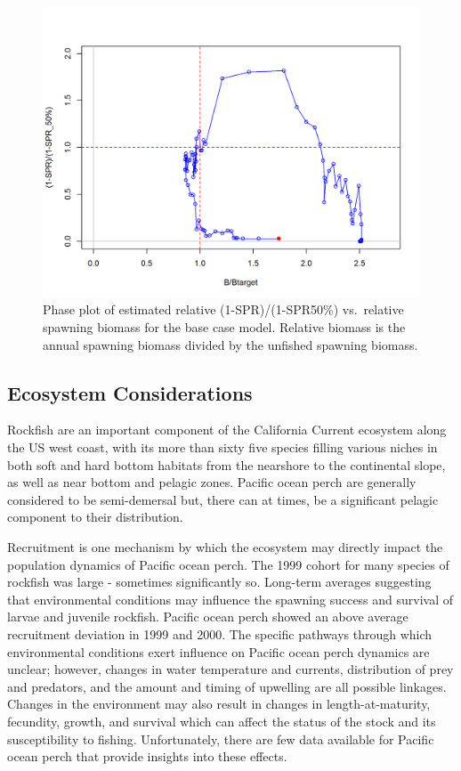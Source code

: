 \documentclass[12pt,]{article}
\begin{document}
\begin{figure}
\centering
\includegraphics{r4ss/plots_mod1/SPR4_phase.png}
\caption{Phase plot of estimated relative (1-SPR)/(1-SPR50\%)
vs.~relative spawning biomass for the base case model. Relative biomass
is the annual spawning biomass divided by the unfished spawning biomass.
\label{fig:Phase_all}}
\end{figure}

\FloatBarrier

\subsection*{Ecosystem Considerations}\label{ecosystem-considerations}

Rockfish are an important component of the California Current ecosystem
along the US west coast, with its more than sixty five species filling
various niches in both soft and hard bottom habitats from the nearshore
to the continental slope, as well as near bottom and pelagic zones.
Pacific ocean perch are generally considered to be semi-demersal but,
there can at times, be a significant pelagic component to their
distribution.

Recruitment is one mechanism by which the ecosystem may directly impact
the population dynamics of Pacific ocean perch. The 1999 cohort for many
species of rockfish was large - sometimes significantly so. Long-term
averages suggesting that environmental conditions may influence the
spawning success and survival of larvae and juvenile rockfish. Pacific
ocean perch showed an above average recruitment deviation in 1999 and
2000. The specific pathways through which environmental conditions exert
influence on Pacific ocean perch dynamics are unclear; however, changes
in water temperature and currents, distribution of prey and predators,
and the amount and timing of upwelling are all possible linkages.
Changes in the environment may also result in changes in
length-at-maturity, fecundity, growth, and survival which can affect the
status of the stock and its susceptibility to fishing. Unfortunately,
there are few data available for Pacific ocean perch that provide
insights into these effects.
\end{document}
